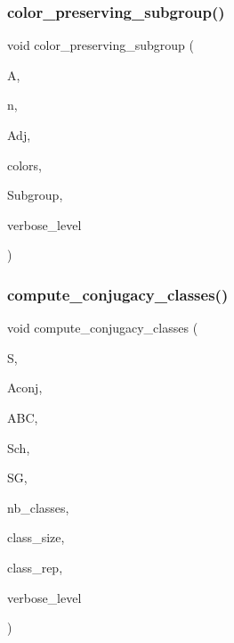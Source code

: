 \subsubsection{\texorpdfstring{color\+\_\+preserving\+\_\+subgroup()}{color\_preserving\_subgroup()}}
{\footnotesize\ttfamily void color\+\_\+preserving\+\_\+subgroup (\begin{DoxyParamCaption}\item[{\mbox{\hyperlink{classaction}{action}} $\ast$}]{A,  }\item[{\mbox{\hyperlink{galois_8h_a09fddde158a3a20bd2dcadb609de11dc}{I\+NT}}}]{n,  }\item[{\mbox{\hyperlink{galois_8h_a122c4acf389c050379f00341fdcd5812}{U\+B\+Y\+TE}} $\ast$}]{Adj,  }\item[{\mbox{\hyperlink{galois_8h_a09fddde158a3a20bd2dcadb609de11dc}{I\+NT}} $\ast$}]{colors,  }\item[{\mbox{\hyperlink{classsims}{sims}} $\ast$\&}]{Subgroup,  }\item[{\mbox{\hyperlink{galois_8h_a09fddde158a3a20bd2dcadb609de11dc}{I\+NT}}}]{verbose\+\_\+level }\end{DoxyParamCaption})}

\mbox{\label{action__global_8_c_a3a3f311d8e19e481707b3e54dbb35066}} 
\subsubsection{\texorpdfstring{compute\+\_\+conjugacy\+\_\+classes()}{compute\_conjugacy\_classes()}}
{\footnotesize\ttfamily void compute\+\_\+conjugacy\+\_\+classes (\begin{DoxyParamCaption}\item[{\mbox{\hyperlink{classsims}{sims}} $\ast$}]{S,  }\item[{\mbox{\hyperlink{classaction}{action}} $\ast$\&}]{Aconj,  }\item[{\mbox{\hyperlink{classaction__by__conjugation}{action\+\_\+by\+\_\+conjugation}} $\ast$\&}]{A\+BC,  }\item[{\mbox{\hyperlink{classschreier}{schreier}} $\ast$\&}]{Sch,  }\item[{\mbox{\hyperlink{classstrong__generators}{strong\+\_\+generators}} $\ast$\&}]{SG,  }\item[{\mbox{\hyperlink{galois_8h_a09fddde158a3a20bd2dcadb609de11dc}{I\+NT}} \&}]{nb\+\_\+classes,  }\item[{\mbox{\hyperlink{galois_8h_a09fddde158a3a20bd2dcadb609de11dc}{I\+NT}} $\ast$\&}]{class\+\_\+size,  }\item[{\mbox{\hyperlink{galois_8h_a09fddde158a3a20bd2dcadb609de11dc}{I\+NT}} $\ast$\&}]{class\+\_\+rep,  }\item[{\mbox{\hyperlink{galois_8h_a09fddde158a3a20bd2dcadb609de11dc}{I\+NT}}}]{verbose\+\_\+level }\end{DoxyParamCaption})}

